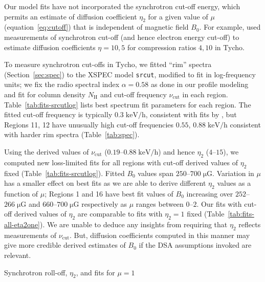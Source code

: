 \documentclass[iop, apj, numberedappendix]{emulateapj}
\newcommand*{\mt}{\mathrm}
\newcommand*{\unit}[1]{\;\mt{#1}}  %
\newcommand*{\muG}{\unit{\mu G}}
\begin{document}
Our model fits have not incorporated the synchrotron cut-off energy, which
permits an estimate of diffusion coefficient $\eta_2$ for a given value of
$\mu$ (equation~\eqref{eq:cutoff}) that is independent of magnetic field
$B_0$.  For example, \citet{parizot2006} used measurements of synchrotron
cut-off (and hence electron energy cut-off) to estimate diffusion coefficients
$\eta = 10, 5$ for compression ratios $4, 10$ in Tycho.

To measure synchrotron cut-offs in Tycho, we fitted ``rim'' spectra
(Section~\ref{sec:spec}) to the XSPEC model \texttt{srcut}, modified to fit in
log-frequency units; we fix the radio spectral index $\alpha = 0.58$
\citep{sun2011} as done in our profile modeling and fit for column density
$N_{\mt{H}}$ and cut-off frequency $\nu_{\mt{cut}}$ in each region.
Table~\ref{tab:fits-srcutlog} lists best spectrum fit parameters for each
region.  The fitted cut-off frequency is typically $0.3 \unit{keV/h}$,
consistent with fits by \citet{hwang2002}, but Regions 11, 12 have unusually
high cut-off frequencies $0.55$, $0.88 \unit{keV/h}$ consistent with harder rim
spectra (Table~\ref{tab:spec}).

Using the derived values of $\nu_{\mt{cut}}$ ($0.19$--$0.88 \unit{keV/h}$) and
hence $\eta_2$ ($4$--$15$), we computed new loss-limited fits for all regions
with cut-off derived values of $\eta_2$ fixed (Table~\ref{tab:fits-srcutlog}).
Fitted $B_0$ values span $250$--$700 \muG$.  Variation in $\mu$ has a smaller
effect on best fits as we are able to derive different $\eta_2$ values as a
function of $\mu$; Regions 1 and 16 have best fit values of $B_0$ increasing
over $252$--$266 \muG$ and $660$--$700 \muG$ respectively as $\mu$ ranges
between $0$--$2$.  Our fits with cut-off derived values of $\eta_2$ are
comparable to fits with $\eta_2 = 1$ fixed (Table~\ref{tab:fits-all-eta2one}).
We are unable to deduce any insights from requiring that $\eta_2$ reflects
measurements of $\nu_{\mt{cut}}$.  But, diffusion coefficients computed in this
manner may give more credible derived estimates of $B_0$ if the DSA assumptions
invoked are relevant.

\begin{table}
    \scriptsize
    \centering
    \caption{Synchrotron roll-off, $\eta_2$, and fits for $\mu = 1$
    \label{tab:fits-srcutlog}}
    
\end{table}
\end{document}
